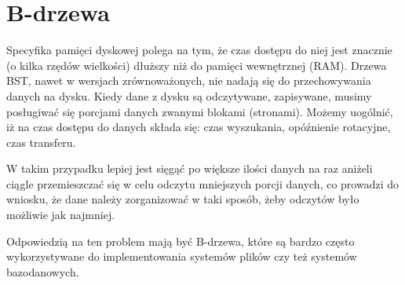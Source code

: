 \section{B-drzewa}

\label{sec:bdrzewa}

Specyfika pamięci dyskowej polega na tym, że czas dostępu do niej jest znacznie (o kilka rzędów wielkości) dłuższy niż do pamięci wewnętrznej (RAM).
Drzewa BST, nawet w wersjach zrównoważonych, nie nadają się do przechowywania danych na dysku.
Kiedy dane z dysku są odczytywane, zapisywane, musimy posługiwać się porcjami danych zwanymi blokami (stronami).
Możemy uogólnić, iż na czas dostępu do danych składa się: czas wyszukania, opóźnienie rotacyjne, czas transferu. 

W takim przypadku lepiej jest sięgąć po większe ilości danych na raz aniżeli ciągle przemieszczać się w celu odczytu mniejszych porcji danych, co prowadzi do wniosku, że dane należy zorganizować w taki sposób, żeby odczytów było możliwie jak najmniej.

Odpowiedzią na ten problem mają być B-drzewa, które są bardzo często wykorzystywane do implementowania systemów plików czy też systemów bazodanowych.


